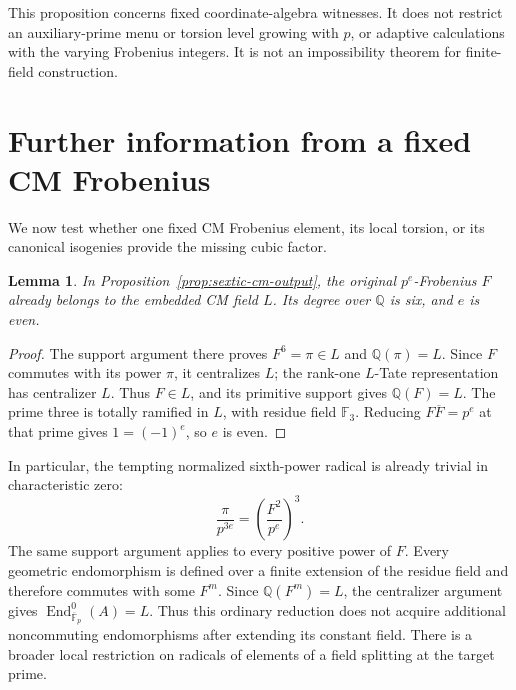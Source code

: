 \documentclass[11pt]{article}
\newtheorem{lemma}[theorem]{Lemma}
\theoremstyle{definition}
\theoremstyle{remark}
\begin{document}
This proposition concerns fixed coordinate-algebra witnesses.
It does not restrict an auxiliary-prime menu or torsion level
growing with \(p\), or adaptive calculations with the varying
Frobenius integers. It is not an impossibility theorem for
finite-field construction.


\section{Further information from a fixed CM Frobenius}
\label{sec:kummer-fixed-frobenius}

We now test whether one fixed CM Frobenius element, its local
torsion, or its canonical isogenies provide the missing cubic factor.

\begin{lemma}\label{lem:kummer-unpowered-cm-frobenius}
In Proposition~\ref{prop:sextic-cm-output}, the original
\(p^e\)-Frobenius \(F\) already belongs to the embedded
CM field \(L\). Its degree over \(\mathbb Q\) is six,
and \(e\) is even.
\end{lemma}
\begin{proof}
The support argument there proves \(F^6=\pi\in L\) and
\(\mathbb Q(\pi)=L\). Since \(F\) commutes with its
power \(\pi\), it centralizes \(L\); the rank-one
\(L\)-Tate representation has centralizer \(L\).
Thus \(F\in L\), and its primitive support gives
\(\mathbb Q(F)=L\). The prime three is totally ramified
in \(L\), with residue field \(\mathbb F_3\).
Reducing \(F\overline F=p^e\) at that prime gives
\(1=(-1)^e\), so \(e\) is even.
\end{proof}

In particular, the tempting normalized sixth-power radical is
already trivial in characteristic zero:
\[
 \frac{\pi}{p^{3e}}=\left(\frac{F^2}{p^e}\right)^3.
\]
The same support argument applies to every positive power of \(F\).
Every geometric endomorphism is defined over a finite extension of
the residue field and therefore commutes with some \(F^m\).
Since \(\mathbb Q(F^m)=L\), the centralizer argument gives
\(\operatorname{End}^0_{\overline{\mathbb F}_p}(A)=L\).
Thus this ordinary reduction does not acquire additional
noncommuting endomorphisms after extending its constant field.
There is a broader local restriction on radicals of elements
of a field splitting at the target prime.
\end{document}
